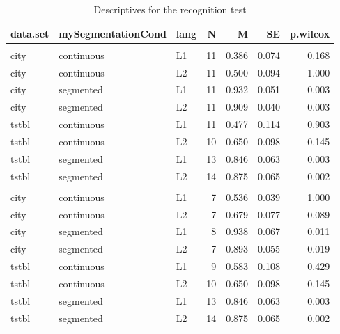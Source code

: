 \documentclass[]{article}
\begin{document}
\begin{table}

\caption{\label{tab:recall-recognition-descriptives}\label{tab:recognition_descriptives}Descriptives for the recognition test}
\centering
\begin{tabular}[t]{lllrrrr}
\toprule
data.set & mySegmentationCond & lang & N & M & SE & p.wilcox\\
\midrule
\addlinespace[0.3em]
\multicolumn{7}{l}{\textbf{all}}\\
\hspace{1em}city & continuous & L1 & 11 & 0.386 & 0.074 & 0.168\\
\hspace{1em}city & continuous & L2 & 11 & 0.500 & 0.094 & 1.000\\
\hspace{1em}city & segmented & L1 & 11 & 0.932 & 0.051 & 0.003\\
\hspace{1em}city & segmented & L2 & 11 & 0.909 & 0.040 & 0.003\\
\hspace{1em}tstbl & continuous & L1 & 11 & 0.477 & 0.114 & 0.903\\
\hspace{1em}tstbl & continuous & L2 & 10 & 0.650 & 0.098 & \vphantom{1} 0.145\\
\hspace{1em}tstbl & segmented & L1 & 13 & 0.846 & 0.063 & \vphantom{1} 0.003\\
\hspace{1em}tstbl & segmented & L2 & 14 & 0.875 & 0.065 & \vphantom{1} 0.002\\
\addlinespace[0.3em]
\multicolumn{7}{l}{\textbf{>= 50\%}}\\
\hspace{1em}city & continuous & L1 & 7 & 0.536 & 0.039 & 1.000\\
\hspace{1em}city & continuous & L2 & 7 & 0.679 & 0.077 & 0.089\\
\hspace{1em}city & segmented & L1 & 8 & 0.938 & 0.067 & 0.011\\
\hspace{1em}city & segmented & L2 & 7 & 0.893 & 0.055 & 0.019\\
\hspace{1em}tstbl & continuous & L1 & 9 & 0.583 & 0.108 & 0.429\\
\hspace{1em}tstbl & continuous & L2 & 10 & 0.650 & 0.098 & 0.145\\
\hspace{1em}tstbl & segmented & L1 & 13 & 0.846 & 0.063 & 0.003\\
\hspace{1em}tstbl & segmented & L2 & 14 & 0.875 & 0.065 & 0.002\\
\bottomrule
\end{tabular}
\end{table}
\end{document}

